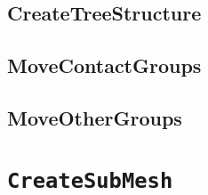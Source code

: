 \subsection{CreateTreeStructure} %
\label{sub:createtreestructure}

\subsection{MoveContactGroups} %
\label{sub:movecontactgroups}

\subsection{MoveOtherGroups} %
\label{sub:moveothergroups}


\section{\texttt{CreateSubMesh}} %
\label{sec:createsubmesh}


